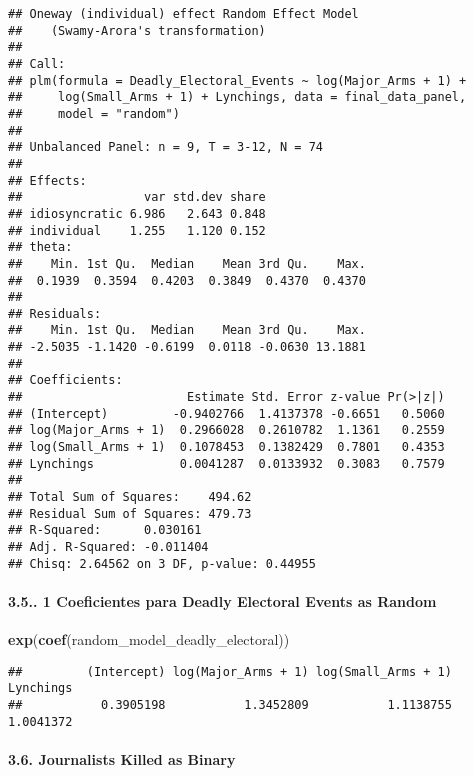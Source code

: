 \documentclass[
  11pt,
]{article}
\newenvironment{Shaded}{\begin{snugshade}}{\end{snugshade}}
\newcommand{\FunctionTok}[1]{\textcolor[rgb]{0.13,0.29,0.53}{\textbf{#1}}}
\newcommand{\NormalTok}[1]{#1}
\begin{document}
\begin{verbatim}
## Oneway (individual) effect Random Effect Model 
##    (Swamy-Arora's transformation)
## 
## Call:
## plm(formula = Deadly_Electoral_Events ~ log(Major_Arms + 1) + 
##     log(Small_Arms + 1) + Lynchings, data = final_data_panel, 
##     model = "random")
## 
## Unbalanced Panel: n = 9, T = 3-12, N = 74
## 
## Effects:
##                 var std.dev share
## idiosyncratic 6.986   2.643 0.848
## individual    1.255   1.120 0.152
## theta:
##    Min. 1st Qu.  Median    Mean 3rd Qu.    Max. 
##  0.1939  0.3594  0.4203  0.3849  0.4370  0.4370 
## 
## Residuals:
##    Min. 1st Qu.  Median    Mean 3rd Qu.    Max. 
## -2.5035 -1.1420 -0.6199  0.0118 -0.0630 13.1881 
## 
## Coefficients:
##                       Estimate Std. Error z-value Pr(>|z|)
## (Intercept)         -0.9402766  1.4137378 -0.6651   0.5060
## log(Major_Arms + 1)  0.2966028  0.2610782  1.1361   0.2559
## log(Small_Arms + 1)  0.1078453  0.1382429  0.7801   0.4353
## Lynchings            0.0041287  0.0133932  0.3083   0.7579
## 
## Total Sum of Squares:    494.62
## Residual Sum of Squares: 479.73
## R-Squared:      0.030161
## Adj. R-Squared: -0.011404
## Chisq: 2.64562 on 3 DF, p-value: 0.44955
\end{verbatim}

\paragraph{3.5.. 1 Coeficientes para Deadly Electoral Events as
Random}\label{coeficientes-para-deadly-electoral-events-as-random}

\begin{Shaded}
\begin{Highlighting}[]
\FunctionTok{exp}\NormalTok{(}\FunctionTok{coef}\NormalTok{(random\_model\_deadly\_electoral))}
\end{Highlighting}
\end{Shaded}

\begin{verbatim}
##         (Intercept) log(Major_Arms + 1) log(Small_Arms + 1)           Lynchings 
##           0.3905198           1.3452809           1.1138755           1.0041372
\end{verbatim}

\paragraph{3.6. Journalists Killed as
Binary}\label{journalists-killed-as-binary}
\end{document}
